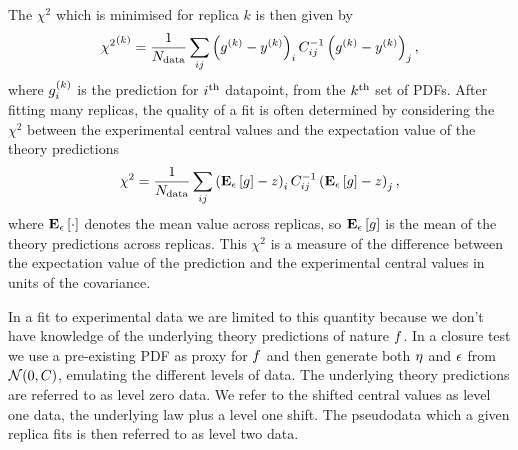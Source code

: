 The $\chi^2$ which is minimised for replica $k$ is then given by
\begin{equation}
    {\chi^2}^{(k)} = \frac{1}{N_{\rm data}} \sum_{ij} \left( g^{(k)} - y^{(k)} \right)_i C^{-1}_{ij} \left( g^{(k)} - y^{(k)} \right)_j,
\end{equation}
where $g^{(k)}_i$ is the prediction for $i^{\rm th}$ datapoint, from
the $k^{\rm th}$ set of PDFs. After fitting many replicas, the quality of a fit
is often determined by considering the $\chi^2$ between the experimental central
values and the expectation value of the theory predictions
\begin{equation}\label{eq:centralchi2}
    \chi^2 = \frac{1}{N_{\rm data}} \sum_{ij} \left( \mathbf{E}_{\epsilon}\left[ g \right] - z \right)_i C^{-1}_{ij} \left( \mathbf{E}_{\epsilon}\left[ g \right] - z \right)_j,
\end{equation}
where $\mathbf{E}_{\epsilon}\left[ \cdot \right]$ denotes the mean value across replicas, so $\mathbf{E}_{\epsilon}\left[ g \right]$ is
the mean of the theory predictions across replicas. This $\chi^2$ is a measure
of the difference between the expectation value of the prediction and the
experimental central values in units of the covariance.

In a fit to experimental data we are limited to this quantity because we don't
have knowledge of the underlying theory predictions of nature $f$. In a
closure test we use a pre-existing PDF as proxy for $f$ and then
generate both $\eta$ and $\epsilon$ from $\mathcal{N}(0, C)$, emulating the
different levels of data. The underlying theory predictions are referred to as
level zero data. We refer to the shifted central values as level one data, the
underlying law plus a level one shift. The pseudodata which a given replica fits
is then referred to as level two data.
